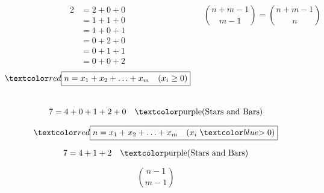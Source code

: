 
\begin{frame}{}
  \begin{center}
  \end{center}

  \begin{columns}
      \begin{align*}
        2 &= 2 + 0 + 0 \\[3pt] 
          &= 1 + 1 + 0 \\[3pt]
          &= 1 + 0 + 1 \\[3pt]
          &= 0 + 2 + 0 \\[3pt]
          &= 0 + 1 + 1 \\[3pt]
          &= 0 + 0 + 2
      \end{align*}
      \pause
      \[
        \red{\boxed{n = x_1 + x_2 + \ldots + x_m \quad (x_i \ge 0)}}
      \]

      \pause
      \[
        {n+m-1 \choose m-1} = {n+m-1 \choose n}
      \]
  \end{columns}
 
  \pause
  \vspace{0.30cm}
  \[
    7 = 4 + 0 + 1 + 2 + 0 \quad \text{\purple{(Stars and Bars)}}
  \] 

  \pause
  \begin{center}
  \end{center}
\end{frame}

\begin{frame}
  \begin{center}
  \end{center}

  \[
    \red{\boxed{n = x_1 + x_2 + \ldots + x_m \quad (x_i \;\blue{>}\; 0)}}
  \]

  \pause
  \vspace{0.50cm}
  \[
    7 = 4 + 1 + 2 \quad \text{\purple{(Stars and Bars)}}
  \] 

  \pause
  \vspace{0.30cm}
  \begin{center}
  \end{center}

  \pause
  \[
    {n-1 \choose m-1}
  \]
\end{frame}

